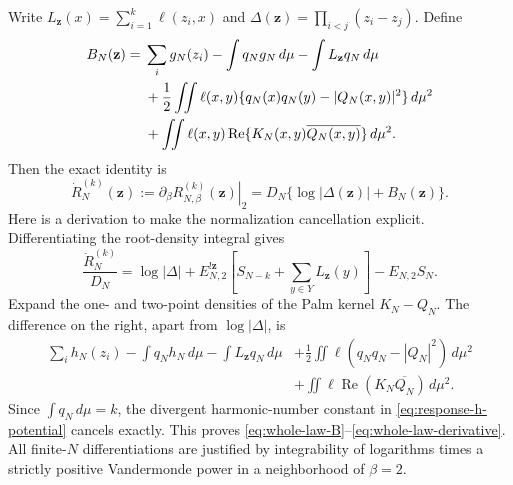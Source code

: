\documentclass[11pt]{article}
\theoremstyle{remark}\newtheorem{remark}[theorem]{Remark}
\begin{document}
Write $L_{\mathbf z}(x)=\sum_{i=1}^k\ell(z_i,x)$ and
$\Delta(\mathbf z)=\prod_{i<j}(z_i-z_j)$. Define
\begin{align}
 B_N(\mathbf z)={}&\sum_i g_N(z_i)-\int q_Ng_N\,d\mu
             -\int L_{\mathbf z}q_N\,d\mu\notag\\
 &+\frac12\iint\ell(x,y)
       \{q_N(x)q_N(y)-|Q_N(x,y)|^2\}\,d\mu^2\notag\\
 &+\iint\ell(x,y)\operatorname{Re}
       \{K_N(x,y)\overline{Q_N(x,y)}\}\,d\mu^2.
 \label{eq:whole-law-B}
\end{align}
Then the exact identity is
\begin{equation}\label{eq:whole-law-derivative}
 \dot R_N^{(k)}(\mathbf z):=
 \left.\partial_\beta R_{N,\beta}^{(k)}(\mathbf z)\right|_2
    =D_N\{\log|\Delta(\mathbf z)|+B_N(\mathbf z)\}.
\end{equation}
Here is a derivation to make the normalization cancellation explicit.
Differentiating the root-density integral gives
\[
 \frac{\dot R_N^{(k)}}{D_N}
  =\log|\Delta|+
   E^{!\mathbf z}_{N,2}\!\left[S_{N-k}+\sum_{y\in Y}L_{\mathbf z}(y)\right]
      -E_{N,2}S_N.
\]
Expand the one- and two-point densities of the Palm kernel $K_N-Q_N$.
The difference on the right, apart from $\log|\Delta|$, is
\begin{align*}
 \sum_i h_N(z_i)-\int q_Nh_N\,d\mu-\int L_{\mathbf z}q_N\,d\mu
 &+\tfrac12\iint\ell(q_Nq_N-|Q_N|^2)\,d\mu^2\\
 &+\iint\ell\operatorname{Re}(K_N\overline{Q_N})\,d\mu^2.
\end{align*}
Since $\int q_N\,d\mu=k$, the divergent harmonic-number constant in
\eqref{eq:response-h-potential} cancels exactly. This proves
\eqref{eq:whole-law-B}--\eqref{eq:whole-law-derivative}. All finite-$N$
differentiations are justified by integrability of logarithms times a
strictly positive Vandermonde power in a neighborhood of $\beta=2$.
\end{document}
